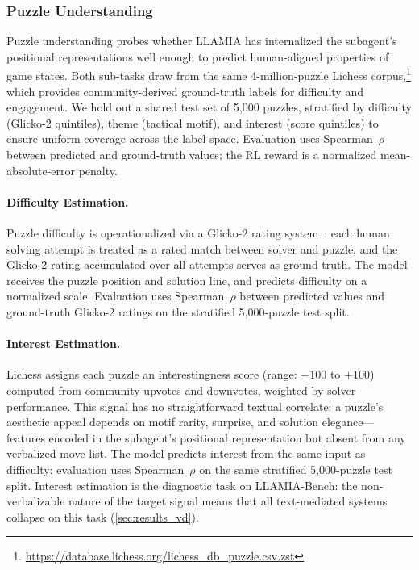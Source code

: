 \subsubsection{Puzzle Understanding}
\label{sec:app_bench_puzzle}

Puzzle understanding probes whether LLAMIA has internalized the subagent's positional representations well enough to predict human-aligned properties of game states. Both sub-tasks draw from the same 4-million-puzzle Lichess corpus,\footnote{\url{https://database.lichess.org/lichess_db_puzzle.csv.zst}} which provides community-derived ground-truth labels for difficulty and engagement. We hold out a shared test set of 5,000 puzzles, stratified by difficulty (Glicko-2 quintiles), theme (tactical motif), and interest (score quintiles) to ensure uniform coverage across the label space. Evaluation uses Spearman~$\rho$ between predicted and ground-truth values; the RL reward is a normalized mean-absolute-error penalty.

\paragraph{Difficulty Estimation.}
\label{sec:app_bench_puzzle_diff}
Puzzle difficulty is operationalized via a Glicko-2 rating system~\citep{glickman2012example}: each human solving attempt is treated as a rated match between solver and puzzle, and the Glicko-2 rating accumulated over all attempts serves as ground truth. The model receives the puzzle position and solution line, and predicts difficulty on a normalized scale. Evaluation uses Spearman~$\rho$ between predicted values and ground-truth Glicko-2 ratings on the stratified 5,000-puzzle test split.

\paragraph{Interest Estimation.}
\label{sec:app_bench_puzzle_int}
Lichess assigns each puzzle an interestingness score (range: $-100$ to $+100$) computed from community upvotes and downvotes, weighted by solver performance. This signal has no straightforward textual correlate: a puzzle's aesthetic appeal depends on motif rarity, surprise, and solution elegance---features encoded in the subagent's positional representation but absent from any verbalized move list. The model predicts interest from the same input as difficulty; evaluation uses Spearman~$\rho$ on the same stratified 5,000-puzzle test split. Interest estimation is the diagnostic task on LLAMIA-Bench: the non-verbalizable nature of the target signal means that all text-mediated systems collapse on this task (\cref{sec:results_vd}).

